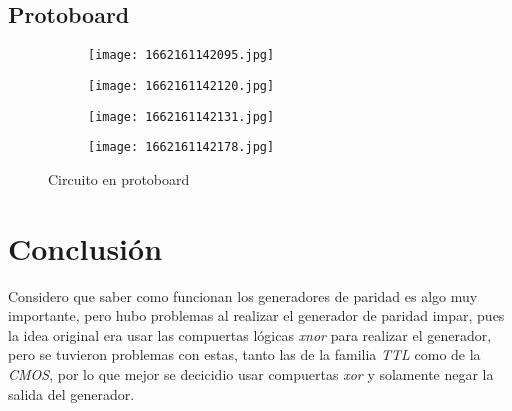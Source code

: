 \documentclass[12pt, oneside, openany]{article}
\begin{document}
\newpage


\newpage
\subsection{Protoboard}

\begin{figure}[h!]
    \centering
    \begin{subfigure}[tl]{0.45\textwidth}
        \centering
        \texttt{[image: 1662161142095.jpg]}
    \end{subfigure}
    \begin{subfigure}[tr]{0.45\textwidth}
        \centering
        \texttt{[image: 1662161142120.jpg]}
    \end{subfigure}
    \begin{subfigure}[bl]{0.45\textwidth}
        \centering
        \texttt{[image: 1662161142131.jpg]}
    \end{subfigure}
    \begin{subfigure}[br]{0.45\linewidth}
        \centering
        \texttt{[image: 1662161142178.jpg]}
    \end{subfigure}
    \caption{\sffamily Circuito en protoboard}
    \label{fig:proto}
\end{figure}

\section{Conclusión}
{\sffamily\Large
    \hspace{0.5cm} Considero que saber como funcionan los generadores de paridad es algo muy importante, pero hubo problemas al realizar el generador de paridad impar, pues la idea original era usar las compuertas lógicas \emph{xnor} para realizar el generador, pero se tuvieron problemas con estas, tanto las de la familia \emph{TTL} como de la \emph{CMOS}, por lo que mejor se decicidio usar compuertas \emph{xor} y solamente negar la salida del generador.
    
}
\end{document}
